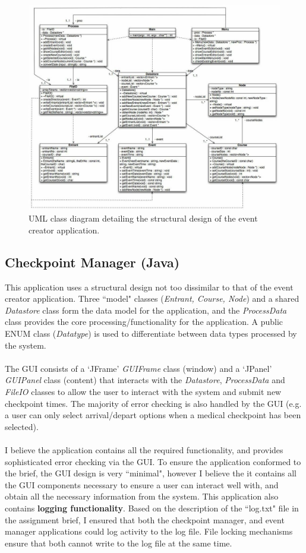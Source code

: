 \documentclass[a4paper, 10pt]{article}
\begin{document}
\begin{figure}[ht!]
\centering
\includegraphics[scale=0.39]{event_creator_class_diagram.jpg}
\caption{UML class diagram detailing the structural design of the event creator application.}
\end{figure}

\clearpage
\subsection{Checkpoint Manager (Java)}

This application uses a structural design not too dissimilar to that of the event creator application. Three ``model" classes (\textit{Entrant, Course, Node}) and a shared \textit{Datastore} class form the data model for the application, and the \textit{ProcessData} class provides the core processing/functionality for the application. A public ENUM class (\textit{Datatype}) is used to differentiate between data types processed by the system. \\\\
The GUI consists of a `JFrame' \textit{GUIFrame} class (window) and a `JPanel' \textit{GUIPanel} class (content) that interacts with the \textit{Datastore}, \textit{ProcessData} and \textit{FileIO} classes to allow the user to interact with the system and submit new checkpoint times. The majority of error checking is also handled by the GUI (e.g. a user can only select arrival/depart options when a medical checkpoint has been selected). \\\\
I believe the application contains all the required functionality, and provides sophisticated error checking via the GUI. To ensure the application conformed to the brief, the GUI design is very ``minimal", however I believe the it contains all the GUI components necessary to ensure a user can interact well with, and obtain all the necessary information from the system. This application also contains \textbf{logging functionality}. Based on the description of the ``log.txt" file in the assignment brief, I ensured that both the checkpoint manager, and event manager applications could log activity to the log file. File locking mechanisms ensure that both cannot write to the log file at the same time.
\end{document}
